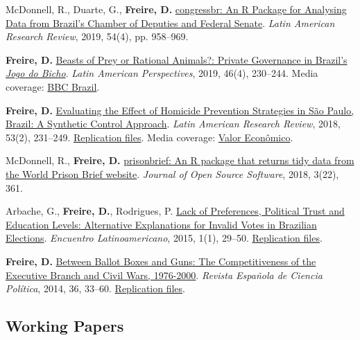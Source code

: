 \documentclass[a4paper]{article}
\renewenvironment{itemize}{
	\begin{list}{}{
			\setlength{\leftmargin}{1.5em}
		}
		}{
	\end{list}
}
\begin{document}
	\begin{itemize}
		\item McDonnell, R., Duarte, G., \textbf{Freire, D.}
			\href{https://doi.org/10.25222/larr.447}{congressbr: An R Package for Analysing Data from Brazil's Chamber of Deputies and Federal Senate}. \textit{Latin American Research Review}, 2019, 54(4), pp. 958--969.
		\item \textbf{Freire, D.} \href{https://doi.org/10.1177/0094582X19846519}{Beasts of Prey or Rational Animals?: Private Governance in Brazil's \emph{Jogo do Bicho}}. \textit{Latin American Perspectives}, 2019, 46(4), 230--244. Media coverage: \href{http://www.bbc.com/portuguese/brasil-40140693}{BBC Brazil}.
		\item \textbf{Freire, D.} \href{https://larrlasa.org/articles/10.25222/larr.334/}{Evaluating the Effect of Homicide Prevention Strategies in São Paulo, Brazil: A Synthetic Control Approach}. \textit{Latin American Research Review}, 2018, 53(2), 231--249. \href{https://github.com/danilofreire/homicides-sp-synth}{Replication files}. Media coverage: \href{http://www.valor.com.br/cultura/5111524/sangue-no-asfalto}{Valor Econômico}.
		\item McDonnell, R., \textbf{Freire, D.} \href{https://doi.org/10.21105/joss.00361}{prisonbrief: An R package that returns tidy data from the World Prison Brief website}. \textit{Journal of Open Source Software}, 2018, 3(22), 361.
		\item Arbache, G., \textbf{Freire, D.}, Rodrigues, P. \href{http://www.iapss.org/wp-content/uploads/2014/10/ELA1.1_2.Lack-of-Preferences-Political-Trust-and-Education-Levels.pdf}{Lack of Preferences, Political Trust and Education Levels: Alternative Explanations for Invalid Votes in Brazilian Elections}. \textit{Encuentro Latinoamericano}, 2015, 1(1), 29--50. \href{https://github.com/danilofreire/invalid-votes-brazil}{Replication files}.
		\item \textbf{Freire, D.} \href{http://recyt.fecyt.es/index.php/recp/article/view/37638}{Between Ballot Boxes and Guns: The Competitiveness of the Executive Branch and Civil Wars, 1976-2000}. \textit{Revista Española de Ciencia Política}, 2014, 36, 33--60. \href{https://doi.org/10.7910/DVN/NSDUYG}{Replication files}.
	\end{itemize}

	\subsection*{Working Papers}
\end{document}

